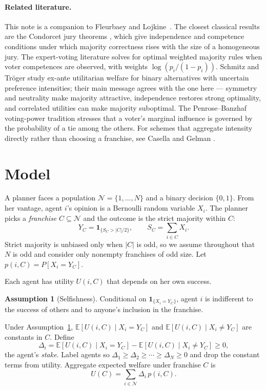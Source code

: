 \documentclass{article}
\theoremstyle{plain}
\theoremstyle{definition}
\newtheorem{assumption}{Assumption}
\newcommand{\E}{\mathbb{E}}
\newcommand{\N}{\mathcal{N}}
\newcommand{\ind}{\mathbf{1}}
\begin{document}
\paragraph{Related literature.}
This note is a companion to Fleurbaey and Lojkine~\cite{fleurbaey-lojkine}.  The closest classical results are the Condorcet jury theorems \cite{condorcet-sep}, which give independence and competence conditions under which majority correctness rises with the size of a homogeneous jury.  The expert-voting literature \cite{nitzan-paroush, berend} solves for optimal weighted majority rules when voter competences are observed, with weights $\log(p_i/(1-p_i))$.  Schmitz and Tr\"oger \cite{schmitz-troger} study ex-ante utilitarian welfare for binary alternatives with uncertain preference intensities; their main message agrees with the one here --- symmetry and neutrality make majority attractive, independence restores strong optimality, and correlated utilities can make majority suboptimal.  The Penrose--Banzhaf voting-power tradition \cite{penrose, banzhaf} stresses that a voter's marginal influence is governed by the probability of a tie among the others.  For schemes that aggregate intensity directly rather than choosing a franchise, see Casella and Gelman \cite{casella-gelman}.

\section{Model}\label{sec:model}

A planner faces a population $\N = \{1, \ldots, N\}$ and a binary decision $\{0,1\}$.  From her vantage, agent $i$'s opinion is a Bernoulli random variable $X_i$.  The planner picks a \emph{franchise} $C \subseteq \N$ and the outcome is the strict majority within $C$:
\[
    Y_C = \ind_{\{S_C > |C|/2\}},
    \qquad
    S_C = \sum_{i \in C} X_i .
\]
Strict majority is unbiased only when $|C|$ is odd, so we assume throughout that $N$ is odd and consider only nonempty franchises of odd size.  Let $p(i, C) = P[X_i = Y_C]$.

Each agent has utility $U(i, C)$ that depends on her own success.

\begin{assumption}[Selfishness]\label{ass:selfish}
Conditional on $\ind_{\{X_i = Y_C\}}$, agent $i$ is indifferent to the success of others and to anyone's inclusion in the franchise.
\end{assumption}

Under Assumption~\ref{ass:selfish}, $\E[U(i, C) \mid X_i = Y_C]$ and $\E[U(i, C) \mid X_i \neq Y_C]$ are constants in $C$.  Define
\[
    \Delta_i = \E[U(i, C) \mid X_i = Y_C] - \E[U(i, C) \mid X_i \neq Y_C] \geq 0,
\]
the agent's \emph{stake}.  Label agents so $\Delta_1 \geq \Delta_2 \geq \cdots \geq \Delta_N \geq 0$ and drop the constant terms from utility.  Aggregate expected welfare under franchise $C$ is
\begin{equation}\label{eq:welfare}
    U(C) = \sum_{i \in \N} \Delta_i\, p(i, C).
\end{equation}
\end{document}
